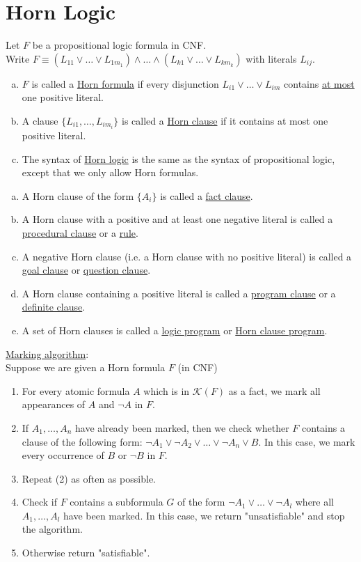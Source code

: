 \documentclass[a4paper]{article}
\newcommand{\ul}{\underline}
\begin{document}
\section{Horn Logic}
Let $F$ be a propositional logic formula in CNF.\\
Write $F\equiv (L_{11}\vee\dots\vee L_{1m_1})\wedge\dots\wedge(L_{k1}\vee\dots\vee L_{km_k})$ with literals $L_{ij}$.
\begin{enumerate}[(a)]
	\item $F$ is called a \ul{Horn formula} if every disjunction $L_{i1}\vee\dots\vee L_{im}$ contains \ul{at most} one positive literal.
	\item A clause $\{L_{i1},\dots,L_{im_i}\}$ is called a \ul{Horn clause} if it contains at most one positive literal.
	\item The syntax of \ul{Horn logic} is the same as the syntax of propositional logic, except that we only allow Horn formulas.
\end{enumerate}
\begin{enumerate}[(a)]
	\item A Horn clause of the form $\{A_i\}$ is called a \ul{fact clause}.
	\item A Horn clause with a positive and at least one negative literal is called a \ul{procedural clause} or a \ul{rule}.
	\item A negative Horn clause (i.e. a Horn clause with no positive literal) is called a \ul{goal clause} or \ul{question clause}.
	\item A Horn clause containing a positive literal is called a \ul{program clause} or a \ul{definite clause}.
	\item A set of Horn clauses is called a \ul{logic program} or \ul{Horn clause program}.
\end{enumerate}
\ul{Marking algorithm}:\\
Suppose we are given a Horn formula $F$ (in CNF)
\begin{enumerate}[(1)]
	\item For every atomic formula $A$ which is in $\mathcal{K}(F)$ as a fact, we mark all appearances of $A$ and $\neg A$ in $F$.
	\item If $A_1,\dots,A_n$ have already been marked, then we check whether $F$ contains a clause of the following form: $\neg A_1\vee\neg A_2\vee\dots\vee\neg A_n\vee B$. In this case, we mark every occurrence of $B$ or $\neg B$ in $F$.
	\item Repeat (2) as often as possible.
	\item Check if $F$ contains a subformula $G$ of the form $\neg A_1\vee\dots\vee\neg A_l$ where all $A_1,\dots,A_l$ have been marked. In this case, we return "unsatisfiable" and stop the algorithm.
	\item Otherwise return "satisfiable".
\end{enumerate}
\end{document}
